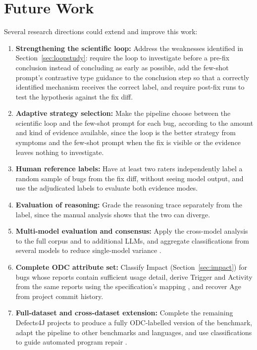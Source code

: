 \documentclass{iutbscthesis}
\begin{document}
\section{Future Work}
\label{sec:future}

Several research directions could extend and improve this work:

\begin{enumerate}
    \item \textbf{Strengthening the scientific loop:} Address the weaknesses identified in Section~\ref{sec:loopstudy}: require the loop to investigate before a pre-fix conclusion instead of concluding as early as possible, add the few-shot prompt's contrastive type guidance to the conclusion step so that a correctly identified mechanism receives the correct label, and require post-fix runs to test the hypothesis against the fix diff.
    \item \textbf{Adaptive strategy selection:} Make the pipeline choose between the scientific loop and the few-shot prompt for each bug, according to the amount and kind of evidence available, since the loop is the better strategy from symptoms and the few-shot prompt when the fix is visible or the evidence leaves nothing to investigate.
    \item \textbf{Human reference labels:} Have at least two raters independently label a random sample of bugs from the fix diff, without seeing model output, and use the adjudicated labels to evaluate both evidence modes.
    \item \textbf{Evaluation of reasoning:} Grade the reasoning trace separately from the label, since the manual analysis shows that the two can diverge.
    \item \textbf{Multi-model evaluation and consensus:} Apply the cross-model analysis to the full corpus and to additional LLMs, and aggregate classifications from several models to reduce single-model variance \cite{colavito2024llm}.
    \item \textbf{Complete ODC attribute set:} Classify Impact (Section~\ref{sec:impact}) for bugs whose reports contain sufficient usage detail, derive Trigger and Activity from the same reports using the specification's mapping \cite{ibm2013odc}, and recover Age from project commit history.
    \item \textbf{Full-dataset and cross-dataset extension:} Complete the remaining Defects4J projects to produce a fully ODC-labelled version of the benchmark, adapt the pipeline to other benchmarks and languages, and use classifications to guide automated program repair \cite{durieux2018automatic}.
\end{enumerate}
\end{document}
